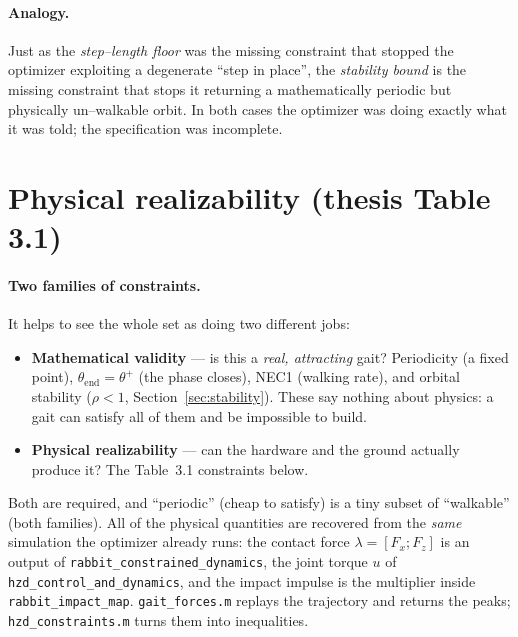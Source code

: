 \documentclass[11pt,a4paper]{article}
\newcommand{\fname}[1]{\texttt{#1}}          %
\begin{document}
\paragraph{Analogy.} Just as the \emph{step--length floor} was the missing
constraint that stopped the optimizer exploiting a degenerate ``step in place'',
the \emph{stability bound} is the missing constraint that stops it returning a
mathematically periodic but physically un--walkable orbit. In both cases the
optimizer was doing exactly what it was told; the specification was incomplete.

\section{Physical realizability (thesis Table 3.1)}
\label{sec:physical}
\paragraph{Two families of constraints.} It helps to see the whole set as doing
two different jobs:
\begin{itemize}
  \item \textbf{Mathematical validity} --- is this a \emph{real, attracting}
        gait? Periodicity (a fixed point), $\theta_{\text{end}}=\theta^{+}$
        (the phase closes), NEC1 (walking rate), and orbital stability
        ($\rho<1$, Section~\ref{sec:stability}). These say nothing about
        physics: a gait can satisfy all of them and be impossible to build.
  \item \textbf{Physical realizability} --- can the hardware and the ground
        actually produce it? The Table~3.1 constraints below.
\end{itemize}
Both are required, and ``periodic'' (cheap to satisfy) is a tiny subset of
``walkable'' (both families). All of the physical quantities are recovered from
the \emph{same} simulation the optimizer already runs: the contact force
$\lambda=[F_x;F_z]$ is an output of \fname{rabbit\_constrained\_dynamics}, the
joint torque $u$ of \fname{hzd\_control\_and\_dynamics}, and the impact impulse
is the multiplier inside \fname{rabbit\_impact\_map}. \fname{gait\_forces.m}
replays the trajectory and returns the peaks; \fname{hzd\_constraints.m} turns
them into inequalities.
\end{document}
